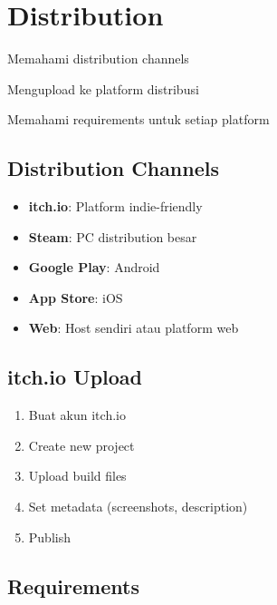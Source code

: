 
\section{Distribution}

\begin{learningoutcomes}
\item Memahami distribution channels
\item Mengupload ke platform distribusi
\item Memahami requirements untuk setiap platform
\end{learningoutcomes}

\subsection{Distribution Channels}

\begin{itemize}
\item \textbf{itch.io}: Platform indie-friendly
\item \textbf{Steam}: PC distribution besar
\item \textbf{Google Play}: Android
\item \textbf{App Store}: iOS
\item \textbf{Web}: Host sendiri atau platform web
\end{itemize}

\subsection{itch.io Upload}

\begin{enumerate}
\item Buat akun itch.io
\item Create new project
\item Upload build files
\item Set metadata (screenshots, description)
\item Publish
\end{enumerate}

\subsection{Requirements}

